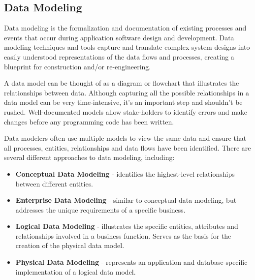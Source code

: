 ﻿\documentclass[]{report}
\begin{document}
  \subsection*{Data Modeling }
Data modeling is the formalization and documentation of existing processes and events that occur during application software design and development. Data modeling techniques and tools capture and translate complex system designs into easily understood representations of the data flows and processes, creating a blueprint for construction and/or re-engineering.

A data model can be thought of as a diagram or flowchart that illustrates the relationships between data. Although capturing all the possible relationships in a data model can be very time-intensive, it's an important step and shouldn't be rushed. Well-documented models allow stake-holders to identify errors and make changes before any programming code has been written.

Data modelers often use multiple models to view the same data and ensure that all processes, entities, relationships and data flows have been identified. There are several different approaches to data modeling, including:
\begin{itemize}
\item  \textbf{Conceptual Data Modeling} - identifies the highest-level relationships between different entities.

\item  \textbf{Enterprise Data Modeling} - similar to conceptual data modeling, but addresses the unique requirements of a specific business. 

\item  \textbf{Logical Data Modeling} - illustrates the specific entities, attributes and relationships involved in a business function. Serves as the basis for the creation of the physical data model.

\item  \textbf{Physical Data Modeling} - represents an application and database-specific implementation of a logical data model.
    \end{itemize}

\end{document}
